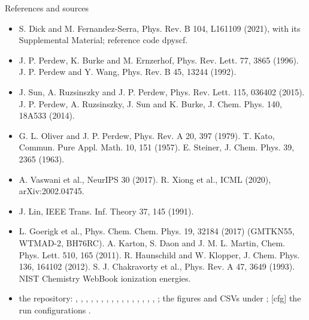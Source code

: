 \begin{frame}{References and sources}
  \scriptsize
  \begin{itemize}
    \item [DFS21] S. Dick and M. Fernandez-Serra, Phys. Rev. B 104, L161109 (2021), with its Supplemental Material; reference code dpyscf.
    \item [PBE96] J. P. Perdew, K. Burke and M. Ernzerhof, Phys. Rev. Lett. 77, 3865 (1996). \quad [PW92] J. P. Perdew and Y. Wang, Phys. Rev. B 45, 13244 (1992).
    \item [SCAN15] J. Sun, A. Ruzsinszky and J. P. Perdew, Phys. Rev. Lett. 115, 036402 (2015). \quad [PRSB14] J. P. Perdew, A. Ruzsinszky, J. Sun and K. Burke, J. Chem. Phys. 140, 18A533 (2014).
    \item [OP79] G. L. Oliver and J. P. Perdew, Phys. Rev. A 20, 397 (1979). \quad [Kato57] T. Kato, Commun. Pure Appl. Math. 10, 151 (1957). \quad [Steiner63] E. Steiner, J. Chem. Phys. 39, 2365 (1963).
    \item [Vas17] A. Vaswani et al., NeurIPS 30 (2017). \quad [Xio20] R. Xiong et al., ICML (2020), arXiv:2002.04745.
    \item [Lin91] J. Lin, IEEE Trans. Inf. Theory 37, 145 (1991).
    \item [Goe17] L. Goerigk et al., Phys. Chem. Chem. Phys. 19, 32184 (2017) (GMTKN55, WTMAD-2, BH76RC). \quad [W411] A. Karton, S. Daon and J. M. L. Martin, Chem. Phys. Lett. 510, 165 (2011). \quad [HK12] R. Haunschild and W. Klopper, J. Chem. Phys. 136, 164102 (2012). \quad [Chak93] S. J. Chakravorty et al., Phys. Rev. A 47, 3649 (1993). \quad [NIST] NIST Chemistry WebBook ionization energies.
    \item [code] the repository: , , , , , , , , , , , , , , , , ; the figures and CSVs under ; [cfg] the run configurations .
  \end{itemize}
\end{frame}
